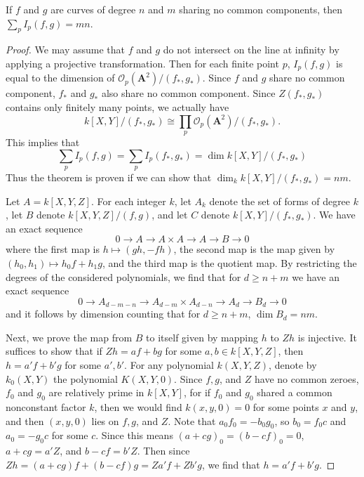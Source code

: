 \begin{theorem}
    If $f$ and $g$ are curves of degree $n$ and $m$ sharing no common components, then $\sum_p I_p(f,g) = mn$.
\end{theorem}
\begin{proof}
    We may assume that $f$ and $g$ do not intersect on the line at infinity by applying a projective transformation. Then for each finite point $p$, $I_p(f,g)$ is equal to the dimension of $\mathcal{O}_p(\mathbf{A}^2)/(f_*,g_*)$. Since $f$ and $g$ share no common component, $f_*$ and $g_*$ also share no common component. Since $Z(f_*,g_*)$ contains only finitely many points, we actually have
    \[ k[X,Y]/(f_*,g_*) \cong \prod_p \mathcal{O}_p(\mathbf{A}^2)/(f_*,g_*). \]
    This implies that
    \[ \sum_p I_p(f,g) = \sum_p I_p(f_*,g_*) = \dim k[X,Y]/(f_*,g_*) \]
    Thus the theorem is proven if we can show that $\dim_k k[X,Y]/(f_*,g_*) = nm$.

    Let $A = k[X,Y,Z]$. For each integer $k$, let $A_k$ denote the set of forms of degree $k$, let $B$ denote $k[X,Y,Z]/(f,g)$, and let $C$ denote $k[X,Y]/(f_*,g_*)$. We have an exact sequence
    \[ 0 \to A \to A \times A \to A \to B \to 0 \]
    where the first map is $h \mapsto (gh,-fh)$, the second map is the map given by $(h_0,h_1) \mapsto h_0f + h_1g$, and the third map is the quotient map. By restricting the degrees of the considered polynomials, we find that for $d \geq n + m$ we have an exact sequence
    \[ 0 \to A_{d-m-n} \to A_{d-m} \times A_{d-n} \to A_d \to B_d \to 0 \]
    and it follows by dimension counting that for $d \geq n + m$, $\dim B_d = nm$.

    Next, we prove the map from $B$ to itself given by mapping $h$ to $Zh$ is injective. It suffices to show that if $Zh = af + bg$ for some $a,b \in k[X,Y,Z]$, then $h = a'f + b'g$ for some $a',b'$. For any polynomial $k(X,Y,Z)$, denote by $k_0(X,Y)$ the polynomial $K(X,Y,0)$. Since $f,g$, and $Z$ have no common zeroes, $f_0$ and $g_0$ are relatively prime in $k[X,Y]$, for if $f_0$ and $g_0$ shared a common nonconstant factor $k$, then we would find $k(x,y,0) = 0$ for some points $x$ and $y$, and then $(x,y,0)$ lies on $f,g$, and $Z$. Note that $a_0f_0 = -b_0g_0$, so $b_0 = f_0c$ and $a_0 = -g_0c$ for some $c$. Since this means $(a + cg)_0 = (b - cf)_0 = 0$, $a + cg = a'Z$, and $b - cf = b'Z$. Then since $Zh = (a + cg)f + (b-cf)g = Za'f + Zb'g$, we find that $h = a'f + b'g$.


\end{proof}

